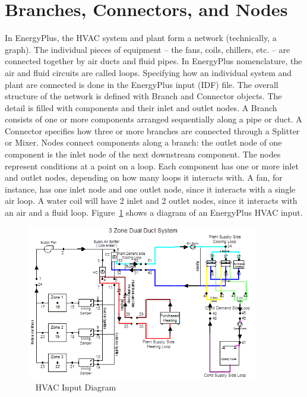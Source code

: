 \section{Branches, Connectors, and Nodes}\label{branches-connectors-and-nodes}

In EnergyPlus, the HVAC system and plant form a network (technically, a graph). The individual pieces of equipment -- the fans, coils, chillers, etc. -- are connected together by air ducts and fluid pipes. In EnergyPlus nomenclature, the air and fluid circuits are called loops. Specifying how an individual system and plant are connected is done in the EnergyPlus input (IDF) file. The overall structure of the network is defined with Branch and Connector objects. The detail is filled with components and their inlet and outlet nodes. A Branch consists of one or more components arranged sequentially along a pipe or duct. A Connector specifies how three or more branches are connected through a Splitter or Mixer. Nodes connect components along a branch: the outlet node of one component is the inlet node of the next downstream component. The nodes represent conditions at a point on a loop. Each component has one or more inlet and outlet nodes, depending on how many loops it interacts with. A fan, for instance, has one inlet node and one outlet node, since it interacts with a single air loop. A water coil will have 2 inlet and 2 outlet nodes, since it interacts with an air and a fluid loop. Figure~\ref{fig:hvac-input-diagram} shows a diagram of an EnergyPlus HVAC input.

\begin{figure}[hbtp] %
\centering
\includegraphics[width=0.9\textwidth, height=0.9\textheight, keepaspectratio=true]{media/image002.png}
\caption{  HVAC Input Diagram \protect \label{fig:hvac-input-diagram}}
\end{figure}

